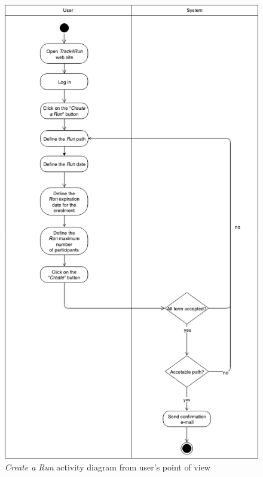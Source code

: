 \begin{figure}[H]
\begin{center}
  \includegraphics[height=0.58\paperheight]{img/activity/CreateRun.png}
  \hspace{0.05\linewidth}
  \centering
  \caption{\textit{Create a Run} activity diagram from user's point of view}
  \label{img:createRunActivityDiagram}
\end{center}
\end{figure}

